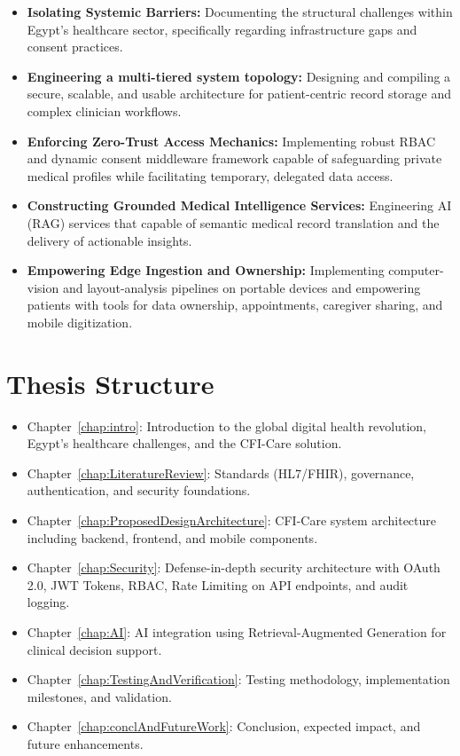 \begin{itemize}
      \item \textbf{Isolating Systemic Barriers:} Documenting the structural challenges within Egypt's healthcare sector, specifically regarding
            infrastructure gaps and consent practices.
      \item \textbf{Engineering a multi-tiered system topology:} Designing and compiling a secure, scalable, and usable architecture for patient-centric
            record storage and complex clinician workflows.
      \item \textbf{Enforcing Zero-Trust Access Mechanics:} Implementing robust RBAC and dynamic consent middleware framework capable of safeguarding private medical profiles while
            facilitating temporary, delegated data access.
      \item \textbf{Constructing Grounded Medical Intelligence Services:} Engineering AI (RAG) services that capable of semantic medical record translation and the delivery of
            actionable insights.
      \item \textbf{Empowering Edge Ingestion and Ownership:} Implementing computer-vision and layout-analysis pipelines on portable devices and empowering patients with tools for data ownership, appointments, caregiver
            sharing, and mobile digitization.
\end{itemize}

\section{Thesis Structure}
\begin{itemize}
      \item Chapter~\ref{chap:intro}: Introduction to the global digital health revolution,
            Egypt's healthcare challenges, and the CFI-Care solution.
      \item Chapter~\ref{chap:LiteratureReview}: Standards (HL7/FHIR), governance,
            authentication, and security foundations.
      \item Chapter~\ref{chap:ProposedDesignArchitecture}: CFI-Care system architecture
            including backend, frontend, and mobile components.
      \item Chapter~\ref{chap:Security}: Defense-in-depth security architecture with OAuth
            2.0, JWT Tokens, RBAC, Rate Limiting on API endpoints, and audit logging.
      \item Chapter~\ref{chap:AI}: AI integration using Retrieval-Augmented Generation for
            clinical decision support.
      \item Chapter~\ref{chap:TestingAndVerification}: Testing methodology, implementation
            milestones, and validation.
      \item Chapter~\ref{chap:conclAndFutureWork}: Conclusion, expected impact, and future
            enhancements.
\end{itemize}

